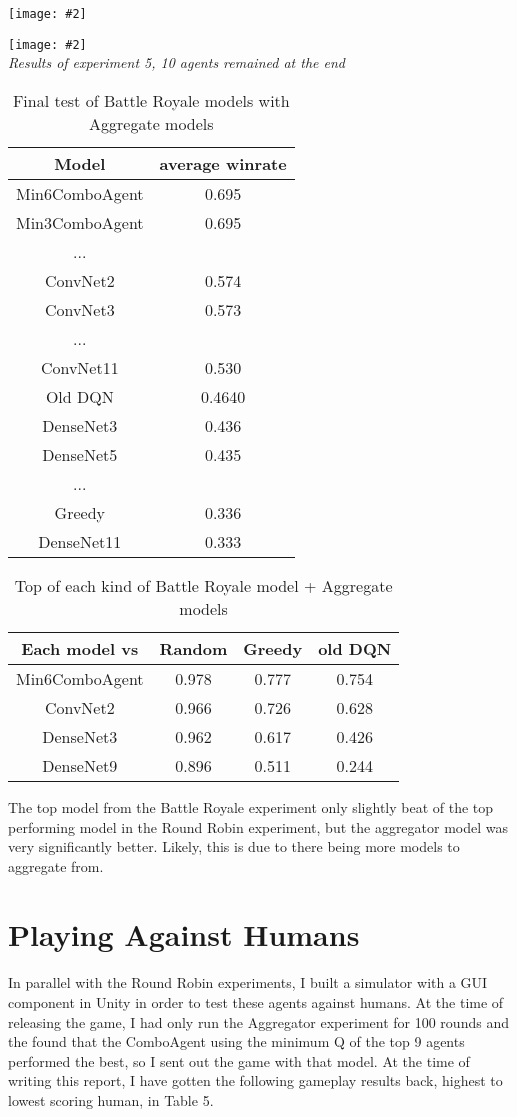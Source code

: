 \documentclass{article}
\newcommand{\pic}[3]{
\begin{center}
\texttt{[image: \#2]}\\
\small\textit{#3}
\end{center}
}
\newcommand{\beginTable}[2]{
\begin{table}[t]
\caption{#1}
\vskip 0.15in
\begin{center}
\begin{small}
\begin{sc}
\begin{tabular}{#2}
\toprule
}
\newcommand{\finTable}{
\bottomrule
\end{tabular}
\end{sc}
\end{small}
\end{center}
\vskip -0.1in
\end{table}
}
\begin{document}
\pic{1.2}{Alg2.png}{}

\pic{.4}{Exp5.png}{Results of experiment 5, 10 agents remained at the end}

\beginTable{Final test of Battle Royale models with Aggregate models}{cc}
Model & average winrate \\
\midrule
Min6ComboAgent & 0.695 \\
Min3ComboAgent & 0.695 \\
...\\
ConvNet2 & 0.574\\
ConvNet3 & 0.573\\
...\\
ConvNet11 & 0.530\\
Old DQN & 0.4640\\
DenseNet3 & 0.436\\
DenseNet5 & 0.435\\
...\\
Greedy & 0.336\\
DenseNet11 & 0.333\\
\finTable

\beginTable{Top of each kind of Battle Royale model + Aggregate models}{cccc}
Each model vs & Random & Greedy & old DQN\\
\midrule
Min6ComboAgent & 0.978 & 0.777 & 0.754\\
ConvNet2 & 0.966 & 0.726 & 0.628\\
DenseNet3 & 0.962 & 0.617 & 0.426\\
DenseNet9 & 0.896 & 0.511 & 0.244\\
\finTable

The top model from the Battle Royale experiment only slightly beat of the top performing model in the Round Robin experiment, but the aggregator model was very significantly better. Likely, this is due to there being more models to aggregate from.

\section{Playing Against Humans}
In parallel with the Round Robin experiments, I built a simulator with a GUI component in Unity in order to test these agents against humans. At the time of releasing the game, I had only run the Aggregator experiment for 100 rounds and the found that the ComboAgent using the minimum Q of the top 9 agents performed the best, so I sent out the game with that model. At the time of writing this report, I have gotten the following gameplay results back, highest to lowest scoring human, in Table 5.
\end{document}
